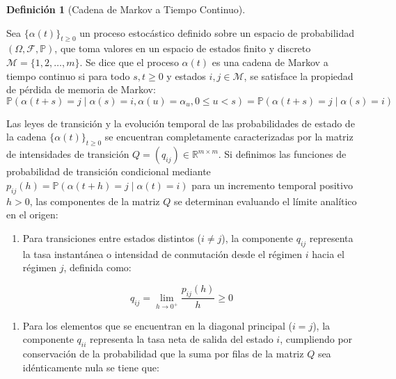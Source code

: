 \documentclass[
  spanish,
  us-letterpaper,
]{scrreprt}
\providecommand{\tightlist}{%
  \setlength{\itemsep}{0pt}\setlength{\parskip}{0pt}}
\numberwithin{equation}{section}
\theoremstyle{plain}
\theoremstyle{plain}
\theoremstyle{plain}
\theoremstyle{definition}
\newtheorem{definition}{Definición}[chapter]
\theoremstyle{remark}
\begin{document}
\begin{definition}[Cadena de Markov a Tiempo
Continuo]\protect\hypertarget{def-cadena-markov}{}\label{def-cadena-markov}

Sea \(\{\alpha(t)\}_{t \ge 0}\) un proceso estocástico definido sobre un
espacio de probabilidad \((\Omega, \mathcal{F}, \mathbb{P})\), que toma
valores en un espacio de estados finito y discreto
\(\mathcal{M} = \{1, 2, \dots, m\}\). Se dice que el proceso
\(\alpha(t)\) es una cadena de Markov a tiempo continuo si para todo
\(s, t \ge 0\) y estados \(i, j \in \mathcal{M}\), se satisface la
propiedad de pérdida de memoria de Markov: \[
\mathbb{P}(\alpha(t+s) = j \mid \alpha(s) = i, \alpha(u) = \alpha_u, 0 \le u < s) = \mathbb{P}(\alpha(t+s) = j \mid \alpha(s) = i)
\]

\end{definition}

Las leyes de transición y la evolución temporal de las probabilidades de
estado de la cadena \(\{\alpha(t)\}_{t \ge 0}\) se encuentran
completamente caracterizadas por la matriz de intensidades de transición
\(Q = (q_{ij}) \in \mathbb{R}^{m \times m}\). Si definimos las funciones
de probabilidad de transición condicional mediante
\(p_{ij}(h) = \mathbb{P}(\alpha(t+h) = j \mid \alpha(t) = i)\) para un
incremento temporal positivo \(h > 0\), las componentes de la matriz
\(Q\) se determinan evaluando el límite analítico en el origen:

\begin{enumerate}
\def\labelenumi{\arabic{enumi}.}
\tightlist
\item
  Para transiciones entre estados distintos (\(i \neq j\)), la
  componente \(q_{ij}\) representa la tasa instantánea o intensidad de
  conmutación desde el régimen \(i\) hacia el régimen \(j\), definida
  como:
\end{enumerate}

\[
q_{ij} = \lim_{h \to 0^+} \frac{p_{ij}(h)}{h} \ge 0
\]

\begin{enumerate}
\def\labelenumi{\arabic{enumi}.}
\setcounter{enumi}{1}
\tightlist
\item
  Para los elementos que se encuentran en la diagonal principal
  (\(i = j\)), la componente \(q_{ii}\) representa la tasa neta de
  salida del estado \(i\), cumpliendo por conservación de la
  probabilidad que la suma por filas de la matriz \(Q\) sea
  idénticamente nula se tiene que:
\end{enumerate}
\end{document}
